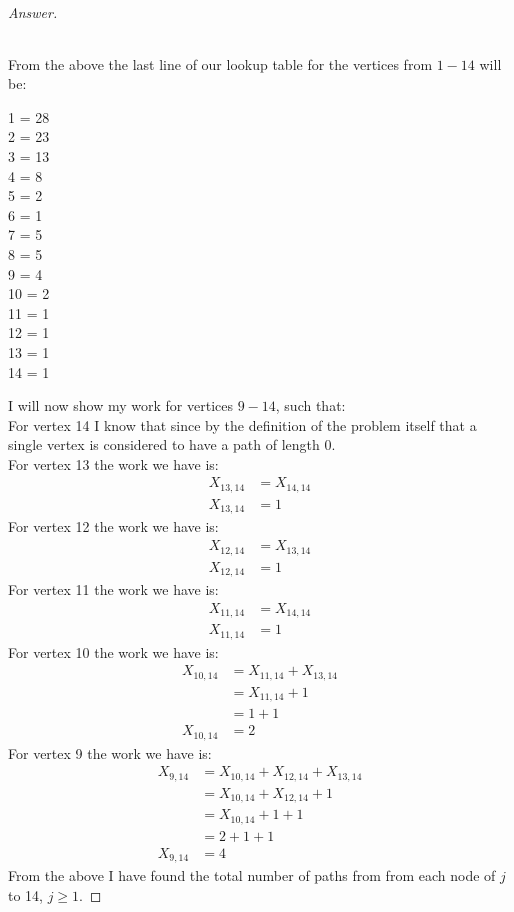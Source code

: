 \documentclass[11pt]{article}
\theoremstyle{definition}
\theoremstyle{definition}
\theoremstyle{definition}
\begin{document}
\begin{proof}[Answer]
\begin{center}
{\begin{tabular}{ | c | c | c | c | c | c | c | c | c | c | c | c | c | c | c |}
    \hline
\end{tabular}
}
\end{center}
From the above the last line of our lookup table for the vertices from $1-14$ will be: \\
\begin{center}
1 = 28 \\
2 = 23 \\
3 = 13 \\
4 = 8 \\
5 = 2 \\
6 = 1 \\
7 = 5 \\
8 = 5 \\
9 = 4 \\
10 = 2 \\
11 = 1 \\
12 = 1 \\
13 = 1 \\
14 = 1 \\
\end{center}
I will now show my work for vertices $9 - 14$, such that:\\
For vertex 14 I know that since by the definition of the problem itself that a single vertex is considered to have a path of length 0. \\
For vertex 13 the work we have is: \\
\begin{align*}
X_{13, 14} &= X_{14, 14} \\
X_{13, 14} &= 1
\end{align*} 
For vertex 12 the work we have is: \\
\begin{align*}
X_{12, 14} &= X_{13, 14} \\
X_{12, 14} &= 1
\end{align*} 
For vertex 11 the work we have is: \\
\begin{align*}
X_{11, 14} &= X_{14, 14} \\
X_{11, 14} &= 1
\end{align*} 
For vertex 10 the work we have is: \\
\begin{align*}
X_{10, 14} &= X_{11, 14} + X_{13, 14} \\
&= X_{11, 14} + 1 \\
&= 1 + 1 \\
X_{10, 14} &= 2
\end{align*} 
For vertex 9 the work we have is: \\
\begin{align*}
X_{9, 14} &= X_{10, 14} + X_{12, 14} + X_{13, 14} \\
 &= X_{10, 14} + X_{12, 14} + 1 \\
 &= X_{10, 14} + 1 + 1 \\
 &= 2 + 1 + 1 \\
X_{9, 14} &= 4
\end{align*}
From the above I have found the total number of paths from from each node of $j$ to 14, $j \geq 1$. 
\end{proof}
\end{document}
